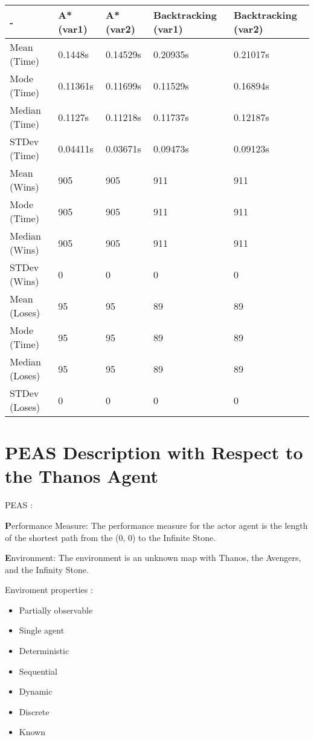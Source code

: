 \documentclass{article}
\begin{document}
\begin{center}
\begin{tabular}{| m{3em} | m{4em} | m{4em}| m{6em} | m{6em} |} 
  \hline
  - &A* (var1) & A* (var2) & Backtracking (var1) & Backtracking (var2) \\ 
  \hline
  Mean (Time) & 0.1448s & 0.14529s & 0.20935s & 0.21017s\\ 
  \hline
  Mode (Time) & 0.11361s & 0.11699s & 0.11529s & 0.16894s\\ 
  \hline
  Median (Time)& 0.1127s & 0.11218s & 0.11737s & 0.12187s\\ 
  \hline
  STDev (Time) & 0.04411s & 0.03671s & 0.09473s & 0.09123s\\
  \hline
  Mean (Wins) & 905 & 905 & 911 & 911\\ 
  \hline
  Mode (Time) & 905 & 905 & 911 & 911\\ 
  \hline
  Median (Wins) & 905 & 905 & 911 & 911\\ 
  \hline
  STDev (Wins) & 0 & 0 & 0 & 0\\
  \hline
  Mean (Loses) & 95 & 95 & 89 & 89\\ 
  \hline
  Mode (Time) & 95 & 95 & 89 & 89\\ 
  \hline
  Median (Loses) & 95 & 95 & 89 & 89\\ 
  \hline
  STDev (Loses) & 0 & 0 & 0 & 0\\
  \hline

\end{tabular}
\end{center}


\section*{PEAS Description with Respect to the Thanos Agent}

PEAS :

\textbf{P}erformance Measure: The performance measure for the actor agent is the length of the shortest path from the (0, 0) to the Infinite Stone.

\textbf{E}nvironment: The environment is an unknown map with Thanos, the Avengers, and the Infinity Stone.

Enviroment properties :
\begin{itemize}
	\item Partially observable
	\item Single agent
	\item Deterministic
	\item Sequential
	\item Dynamic
	\item Discrete
	\item Known
\end{itemize}
\end{document}
